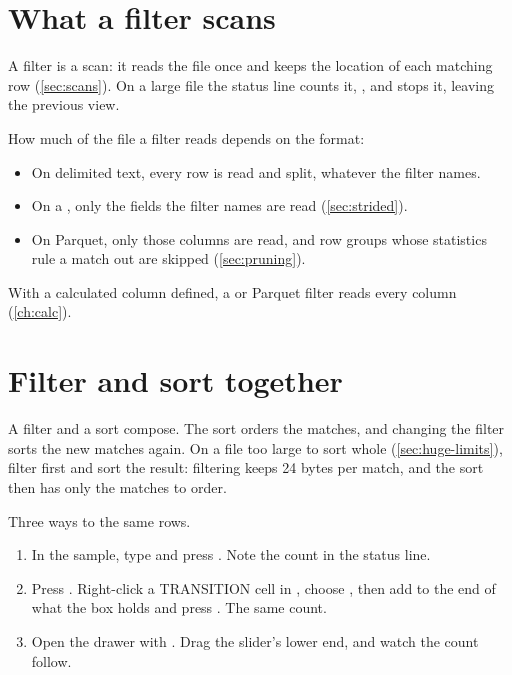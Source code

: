 \section{What a filter scans}\label{sec:filter-scan}

A filter is a scan: it reads the file once and keeps the location of each matching row
(\cref{sec:scans}). On a large file the status line counts it, , and
 stops it, leaving the previous view.

How much of the file a filter reads depends on the format:

\begin{itemize}
\item On delimited text, every row is read and split, whatever the filter names.
\item On a , only the fields the filter names are read (\cref{sec:strided}).
\item On Parquet, only those columns are read, and row groups whose statistics rule a match out are
skipped (\cref{sec:pruning}).
\end{itemize}

With a calculated column defined, a  or Parquet filter reads every column
(\cref{ch:calc}).

\section{Filter and sort together}

A filter and a sort compose. The sort orders the matches, and changing the filter sorts the new matches
again. On a file too large to sort whole (\cref{sec:huge-limits}), filter first and sort the result:
filtering keeps 24 bytes per match, and the sort then has only the matches to order.

\begin{tryit}
Three ways to the same rows.
\begin{enumerate}
\item In the sample, type  and press . Note the
count in the status line.
\item Press . Right-click a TRANSITION cell in , choose , then add  to the end of what the box holds and press .
The same count.
\item Open the drawer with . Drag the  slider's lower end, and watch the count follow.
\end{enumerate}
\end{tryit}
